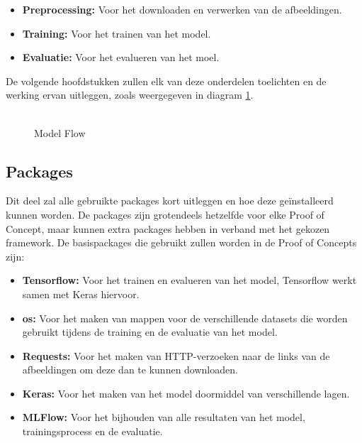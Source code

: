 \begin{itemize}
    \item \textbf{Preprocessing:} Voor het downloaden en verwerken van de afbeeldingen.
    \item \textbf{Training:} Voor het trainen van het model.
    \item \textbf{Evaluatie:} Voor het evalueren van het moel.
\end{itemize}

De volgende hoofdstukken zullen elk van deze onderdelen toelichten en de werking ervan uitleggen, zoals weergegeven in diagram \ref{fig:Model_Flow}.
\begin{figure}[htbp]
    \centering
    \includegraphics[width=0.9]{graphics/Model_Diagram.PNG}
    \caption{Model Flow}
    \label{fig:Model_Flow}
\end{figure}
\subsection{Packages}
Dit deel zal alle gebruikte packages kort uitleggen en hoe deze geïnstalleerd kunnen worden. De packages zijn grotendeels hetzelfde voor elke Proof of Concept, maar kunnen extra packages hebben in verband met het gekozen framework.
De basispackages die gebruikt zullen worden in de Proof of Concepts zijn:
\begin{itemize}
    \item \textbf{Tensorflow:} Voor het trainen en evalueren van het model, Tensorflow werkt samen met Keras hiervoor.
    \item \textbf{os:} Voor het maken van mappen voor de verschillende datasets die worden gebruikt tijdens de training en de evaluatie van het model.
    \item \textbf{Requests:} Voor het maken van HTTP-verzoeken naar de links van de afbeeldingen om deze dan te kunnen downloaden.
    \item \textbf{Keras:} Voor het maken van het model doormiddel van verschillende lagen.
    \item \textbf{MLFlow:} Voor het bijhouden van alle resultaten van het model, trainingsprocess en de evaluatie.
\end{itemize}

